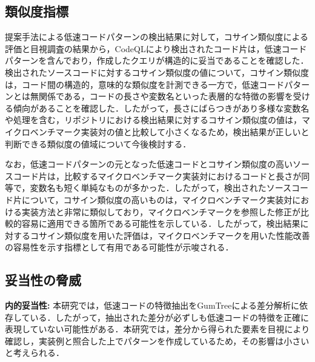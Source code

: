 \documentclass[submit,techrep,noauthor]{ipsj}
\newcommand{\memo}[1]{\colorbox{magenta!30}{{\bf MEMO}:}{\color{red!50} {\textbf{[#1]}}}}
\begin{document}



\subsection{類似度指標}

提案手法による低速コードパターンの検出結果に対して，コサイン類似度による評価と目視調査の結果から，CodeQLにより検出されたコード片は，低速コードパターンを含んでおり，作成したクエリが構造的に妥当であることを確認した．
検出されたソースコードに対するコサイン類似度の値について，コサイン類似度は，コード間の構造的，意味的な類似度を計測できる一方で，低速コードパターンとは無関係である，コードの長さや変数名といった表層的な特徴の影響を受ける傾向があることを確認した．したがって，長さにばらつきがあり多様な変数名や処理を含む，リポジトリにおける検出結果に対するコサイン類似度の値は，マイクロベンチマーク実装対の値と比較して小さくなるため，検出結果が正しいと判断できる類似度の値域について今後検討する．

なお，低速コードパターンの元となった低速コードとコサイン類似度の高いソースコード片は，比較するマイクロベンチマーク実装対におけるコードと長さが同等で，変数名も短く単純なものが多かった．したがって，検出されたソースコード片について，コサイン類似度の高いものは，マイクロベンチマーク実装対における実装方法と非常に類似しており，マイクロベンチマークを参照した修正が比較的容易に適用できる箇所である可能性を示している．したがって，検出結果に対するコサイン類似度を用いた評価は，マイクロベンチマークを用いた性能改善の容易性を示す指標として有用である可能性が示唆される．


\subsection{妥当性の脅威}

\noindent\textbf{内的妥当性:}
本研究では，低速コードの特徴抽出をGumTreeによる差分解析に依存している．したがって，抽出された差分が必ずしも低速コードの特徴を正確に表現していない可能性がある．本研究では，差分から得られた要素を目視により確認し，実装例と照合した上でパターンを作成しているため，その影響は小さいと考えられる．
\end{document}
